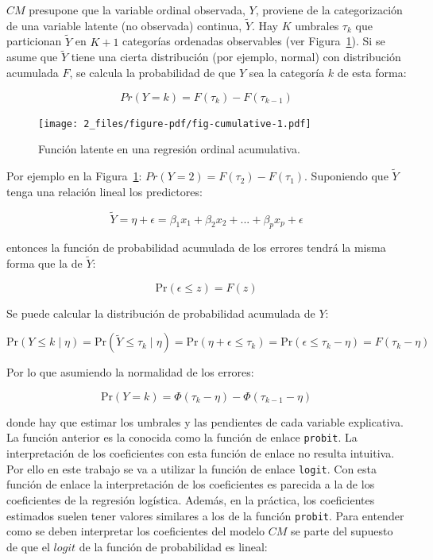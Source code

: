 \documentclass[
  12pt,
  a4paper,
  extrafontsizes,
  onecolumn,
  openright,
  table]{memoir}
\begin{document}
\(CM\) presupone que la variable ordinal observada, \(Y\), proviene de
la categorización de una variable latente (no observada) continua,
\(\tilde{Y}\). Hay \(K\) umbrales \(\tau_k\) que particionan
\(\tilde{Y}\) en \(K + 1\) categorías ordenadas observables (ver
Figura~\ref{fig-cumulative}). Si se asume que \(\tilde{Y}\) tiene una
cierta distribución (por ejemplo, normal) con distribución acumulada
\(F\), se calcula la probabilidad de que \(Y\) sea la categoría \(k\) de
esta forma:

\[Pr(Y = k) = F(\tau_k) - F(\tau_{k-1})\]

\begin{figure}[h]

{\centering \texttt{[image: 2\_files/figure-pdf/fig-cumulative-1.pdf]}

}

\caption{\label{fig-cumulative}Función latente en una regresión ordinal
acumulativa.}

\end{figure}

Por ejemplo en la Figura~\ref{fig-cumulative}:
\(Pr(Y = 2) = F(\tau_2) - F(\tau_{1})\). Suponiendo que \(\tilde{Y}\)
tenga una relación lineal los predictores:

\[\tilde{Y} = \eta + \epsilon = \beta_1 x_1 + \beta_2 x_2 + ... + \beta_p x_p + \epsilon\]

entonces la función de probabilidad acumulada de los errores tendrá la
misma forma que la de \(\tilde{Y}\):

\[\mathrm{Pr}(\epsilon \leq z) = F(z)\]

Se puede calcular la distribución de probabilidad acumulada de \(Y\):

\[\mathrm{Pr}(Y \leq k \mid \eta) = \mathrm{Pr}(\tilde{Y} \leq \tau_k \mid \eta) = \mathrm{Pr}(\eta + \epsilon \leq \tau_k) = \mathrm{Pr}(\epsilon \leq \tau_k - \eta) = F(\tau_k - \eta)\]

Por lo que asumiendo la normalidad de los errores:

\[\mathrm{Pr}(Y = k) = \Phi(\tau_k - \eta) - \Phi(\tau_{k - 1} - \eta)\]

donde hay que estimar los umbrales y las pendientes de cada variable
explicativa. La función anterior es la conocida como la función de
enlace \texttt{probit}. La interpretación de los coeficientes con esta
función de enlace no resulta intuitiva. Por ello en este trabajo se va a
utilizar la función de enlace \texttt{logit}. Con esta función de enlace
la interpretación de los coeficientes es parecida a la de los
coeficientes de la regresión logística. Además, en la práctica, los
coeficientes estimados suelen tener valores similares a los de la
función \texttt{probit}. Para entender como se deben interpretar los
coeficientes del modelo \(CM\) se parte del supuesto de que el \(logit\)
de la función de probabilidad es lineal:
\end{document}
